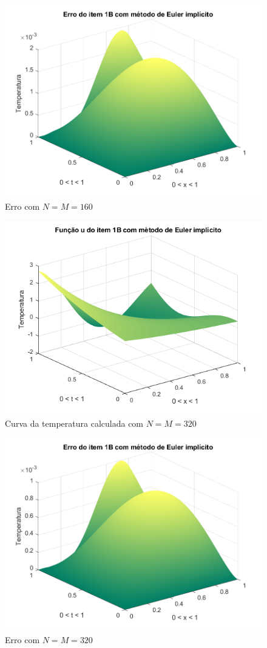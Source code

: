 \documentclass[12pt]{article}
\begin{document}
\begin{spacing}{1.5}
\begin{figure}
    \centering
    \includegraphics[width=0.8\linewidth]{Segunda_Tarefa/ItemB/nm160_erro_B.png}
    \caption{Erro com $N=M=160$}
    \label{fig:BB_nm160_erro}
\end{figure}

\begin{figure}
    \centering
    \includegraphics[width=0.8\linewidth]{Segunda_Tarefa/ItemB/nm320_calculada_B.png}
    \caption{Curva da temperatura calculada com $N=M=320$}
    \label{fig:BB_nm320_calculada}
\end{figure}

\begin{figure}
    \centering
    \includegraphics[width=0.8\linewidth]{Segunda_Tarefa/ItemB/nm320_erro_B.png}
    \caption{Erro com $N=M=320$}
    \label{fig:BB_nm320_erro}
\end{figure}


\end{spacing}
\end{document}
